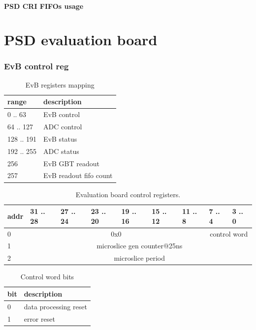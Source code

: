 \documentclass{article}
\begin{document}
\subsection{PSD CRI FIFOs usage}



\newpage
\part{PSD evaluation board}

\section{EvB control reg}
\begin{table}[H]
\centering
\begin{tabular}{| l | l |}
\hline
range & description \\ \hline
0 .. 63 & EvB control \\ \hline
64 .. 127 & ADC control \\ \hline
128 .. 191 & EvB status \\ \hline
192 .. 255 & ADC status \\ \hline
256 & EvB GBT readout \\ \hline
257 & EvB readout fifo count \\ \hline
\end{tabular}
\caption{EvB registers mapping\label{tab6}}
\end{table}

\begin{table}[H]
\centering
\begin{tabular}{| l | l | l | l | l | l | l | l | l |}
\hline
addr & 31 .. 28 & 27 .. 24 & 23 .. 20 & 19 .. 16 & 15 .. 12 & 11 .. 8 & 7 .. 4 & 3 .. 0 \\ \hline
0 & \multicolumn{6}{c|}{0x0}  & \multicolumn{2}{c|}{control word} \\ \hline
1 & \multicolumn{8}{c|}{microslice gen counter@25ns}  \\ \hline
2 & \multicolumn{8}{c|}{microslice period}  \\ \hline
\end{tabular}
\caption{Evaluation board control registers.\label{tab11}}
\end{table}

\begin{table}[H]
\centering
\begin{tabular}{| l | l |}
\hline
bit & description \\ \hline
0 & data processing reset \\ \hline
1 & error reset \\ \hline
\end{tabular}
\caption{Control word bits\label{tab12}}
\end{table}
\end{document}
